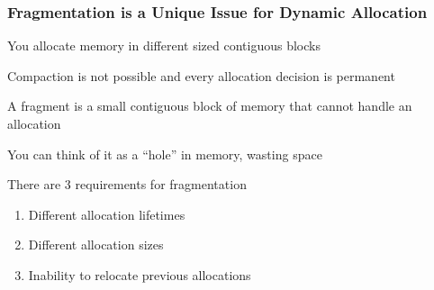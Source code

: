   \begin{frame}
    \frametitle{Fragmentation is a Unique Issue for Dynamic Allocation}

    You allocate memory in different sized contiguous blocks

    \hspace{2em} Compaction is not possible and every allocation decision is
    permanent

    \vspace{2em}

    A fragment is a small contiguous block of memory that cannot handle an allocation

    \hspace{2em} You can think of it as a ``hole'' in memory, wasting space

    \vspace{2em}

    There are 3 requirements for fragmentation
    \begin{enumerate}
        \item Different allocation lifetimes
        \item Different allocation sizes
        \item Inability to relocate previous allocations  
    \end{enumerate}
  \end{frame}

